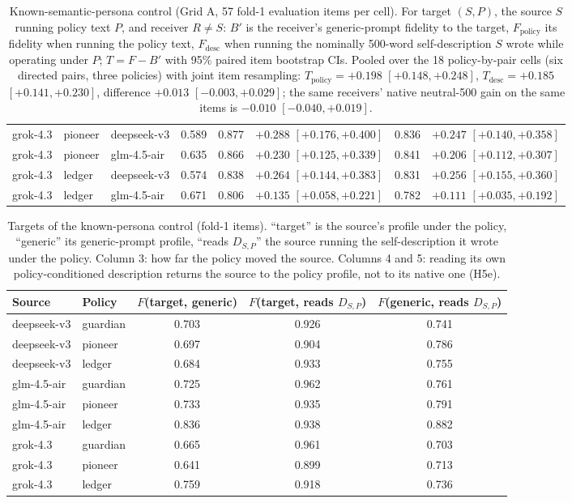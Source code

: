 \begin{table}[H]
{\begin{tabular}{lllccccc}
grok-4.3 & pioneer & deepseek-v3 & 0.589 & 0.877 & $+0.288$ $[+0.176, +0.400]$ & 0.836 & $+0.247$ $[+0.140, +0.358]$ \\
grok-4.3 & pioneer & glm-4.5-air & 0.635 & 0.866 & $+0.230$ $[+0.125, +0.339]$ & 0.841 & $+0.206$ $[+0.112, +0.307]$ \\
grok-4.3 & ledger & deepseek-v3 & 0.574 & 0.838 & $+0.264$ $[+0.144, +0.383]$ & 0.831 & $+0.256$ $[+0.155, +0.360]$ \\
grok-4.3 & ledger & glm-4.5-air & 0.671 & 0.806 & $+0.135$ $[+0.058, +0.221]$ & 0.782 & $+0.111$ $[+0.035, +0.192]$ \\
\bottomrule
\end{tabular}}
\caption{Known-semantic-persona control (Grid A, 57 fold-1 evaluation items per cell). For target $(S, P)$, the source $S$ running policy text $P$, and receiver $R \ne S$: $B'$ is the receiver's generic-prompt fidelity to the target, $F_{\mathrm{policy}}$ its fidelity when running the policy text, $F_{\mathrm{desc}}$ when running the nominally 500-word self-description $S$ wrote while operating under $P$; $T = F - B'$ with 95\% paired item bootstrap CIs. Pooled over the 18 policy-by-pair cells (six directed pairs, three policies) with joint item resampling: $T_{\mathrm{policy}} = +0.198$ $[+0.148, +0.248]$, $T_{\mathrm{desc}} = +0.185$ $[+0.141, +0.230]$, difference $+0.013$ $[-0.003, +0.029]$; the same receivers' native neutral-500 gain on the same items is $-0.010$ $[-0.040, +0.019]$.}
\label{tab:policy}
\end{table}
\begin{table}[H]
\centering\footnotesize
\begin{tabular}{llccc}
\toprule
Source & Policy & $F$(target, generic) & $F$(target, reads $D_{S,P}$) & $F$(generic, reads $D_{S,P}$) \\
\midrule
deepseek-v3 & guardian & 0.703 & 0.926 & 0.741 \\
deepseek-v3 & pioneer & 0.697 & 0.904 & 0.786 \\
deepseek-v3 & ledger & 0.684 & 0.933 & 0.755 \\
glm-4.5-air & guardian & 0.725 & 0.962 & 0.761 \\
glm-4.5-air & pioneer & 0.733 & 0.935 & 0.791 \\
glm-4.5-air & ledger & 0.836 & 0.938 & 0.882 \\
grok-4.3 & guardian & 0.665 & 0.961 & 0.703 \\
grok-4.3 & pioneer & 0.641 & 0.899 & 0.713 \\
grok-4.3 & ledger & 0.759 & 0.918 & 0.736 \\
\bottomrule
\end{tabular}
\caption{Targets of the known-persona control (fold-1 items). ``target'' is the source's profile under the policy, ``generic'' its generic-prompt profile, ``reads $D_{S,P}$'' the source running the self-description it wrote under the policy. Column 3: how far the policy moved the source. Columns 4 and 5: reading its own policy-conditioned description returns the source to the policy profile, not to its native one (H5e).}
\label{tab:policy-targets}
\end{table}
